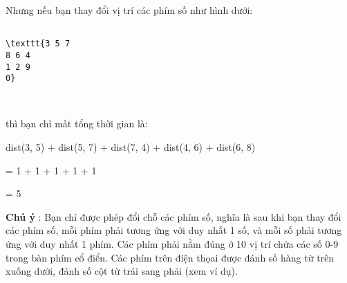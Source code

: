 Nhưng nếu bạn thay đổi vị trí các phím số như hình dưới:
\begin{verbatim}

\texttt{3 5 7
8 6 4
1 2 9
0}\end{verbatim}

 

thì bạn chỉ mất tổng thời gian là:

dist(3, 5) + dist(5, 7) + dist(7, 4) + dist(4, 6) + dist(6, 8)

= 1 + 1 + 1 + 1 + 1

= 5

\textbf{Chú ý } : Bạn chỉ được phép đổi chỗ các phím số, nghĩa là sau khi bạn thay đổi các phím số, mỗi phím phải tương ứng với duy nhất 1 số, và mỗi số phải tương ứng với duy nhất 1 phím. Các phím phải nằm đúng ở 10 vị trí chứa các số 0-9 trong bàn phím cổ điển. Các phím trên điện thọai được đánh số hàng từ trên xuống dưới, đánh số cột từ trái sang phải (xem ví dụ).
